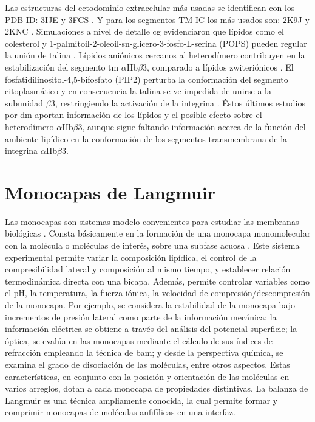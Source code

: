 Las estructuras del ectodominio extracelular más usadas se identifican con los PDB ID: 3IJE \citep{Xiong2009} y 3FCS \citep{Zhu2008}. Y para los segmentos TM-IC los más usados son: 2K9J \citep{Lau2008} y 2KNC \citep{Yang2009}. Simulaciones a nivel de detalle \ac{cg} evidenciaron que lípidos como el colesterol y 1-palmitoil-2-oleoil-sn-glicero-3-fosfo-L-serina (POPS) pueden regular la unión de talina \citep{Kalli2017}. Lípidos aniónicos cercanos al heterodímero contribuyen en la estabilización del segmento \ac{tm} $\alpha$IIb$\beta$3, comparado a lípidos zwiteriónicos \citep{Schmidt2015}. El fosfatidilinositol-4,5-bifosfato (PIP2) perturba la conformación del segmento citoplasmático y en consecuencia la talina se ve impedida de unirse a la subunidad $\beta$3, restringiendo la activación de la integrina \citep{Orowski2015}. Éstos últimos estudios por \ac{dm} aportan información de los lípidos y el posible efecto sobre el heterodímero $\alpha$IIb$\beta$3,  aunque sigue faltando información acerca de la función del ambiente lipídico en la conformación de los segmentos transmembrana de la integrina $\alpha$IIb$\beta$3.

\section{Monocapas de Langmuir}{\label{monocapas}}

Las monocapas son sistemas modelo convenientes para estudiar las membranas biológicas \citep{Davies1961, Marsh1996, Brown2007}. Consta básicamente en la formación de una monocapa monomolecular con la molécula o moléculas de interés, sobre una subfase acuosa \citep{Davies1961}. Este sistema experimental permite variar la composición lipídica, el control de la compresibilidad lateral y composición al mismo tiempo, y establecer relación termodinámica directa con una bicapa. Además, permite controlar variables como el pH, la temperatura, la fuerza iónica, la velocidad de compresión/descompresión de la monocapa. Por ejemplo, se considera la estabilidad de la monocapa bajo incrementos de presión lateral como parte de la información mecánica; la información eléctrica se obtiene a través del análisis del potencial superficie; la óptica, se evalúa en las monocapas mediante el cálculo de sus índices de refracción empleando la técnica de \ac{bam}; y desde la perspectiva química, se examina el grado de disociación de las moléculas, entre otros aspectos. Estas características, en conjunto con la posición y orientación de las moléculas en varios arreglos, dotan a cada monocapa de propiedades distintivas. 
La balanza de Langmuir \citep{Langmuir1917, Blodgett1935} es una técnica ampliamente conocida, la cual permite formar y comprimir monocapas de moléculas anfifílicas en una interfaz.

